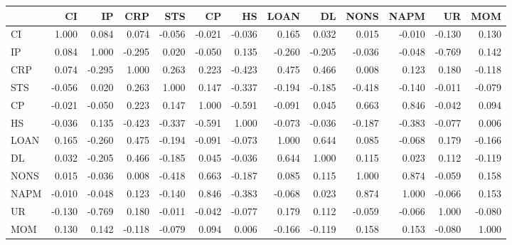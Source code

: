 \begin{tabular}{lrrrrrrrrrrrr}
\toprule
{} &     CI &     IP &    CRP &    STS &     CP &     HS &   LOAN &     DL &   NONS &   NAPM &     UR &    MOM \\
\midrule
CI   &  1.000 &  0.084 &  0.074 & -0.056 & -0.021 & -0.036 &  0.165 &  0.032 &  0.015 & -0.010 & -0.130 &  0.130 \\
IP   &  0.084 &  1.000 & -0.295 &  0.020 & -0.050 &  0.135 & -0.260 & -0.205 & -0.036 & -0.048 & -0.769 &  0.142 \\
CRP  &  0.074 & -0.295 &  1.000 &  0.263 &  0.223 & -0.423 &  0.475 &  0.466 &  0.008 &  0.123 &  0.180 & -0.118 \\
STS  & -0.056 &  0.020 &  0.263 &  1.000 &  0.147 & -0.337 & -0.194 & -0.185 & -0.418 & -0.140 & -0.011 & -0.079 \\
CP   & -0.021 & -0.050 &  0.223 &  0.147 &  1.000 & -0.591 & -0.091 &  0.045 &  0.663 &  0.846 & -0.042 &  0.094 \\
HS   & -0.036 &  0.135 & -0.423 & -0.337 & -0.591 &  1.000 & -0.073 & -0.036 & -0.187 & -0.383 & -0.077 &  0.006 \\
LOAN &  0.165 & -0.260 &  0.475 & -0.194 & -0.091 & -0.073 &  1.000 &  0.644 &  0.085 & -0.068 &  0.179 & -0.166 \\
DL   &  0.032 & -0.205 &  0.466 & -0.185 &  0.045 & -0.036 &  0.644 &  1.000 &  0.115 &  0.023 &  0.112 & -0.119 \\
NONS &  0.015 & -0.036 &  0.008 & -0.418 &  0.663 & -0.187 &  0.085 &  0.115 &  1.000 &  0.874 & -0.059 &  0.158 \\
NAPM & -0.010 & -0.048 &  0.123 & -0.140 &  0.846 & -0.383 & -0.068 &  0.023 &  0.874 &  1.000 & -0.066 &  0.153 \\
UR   & -0.130 & -0.769 &  0.180 & -0.011 & -0.042 & -0.077 &  0.179 &  0.112 & -0.059 & -0.066 &  1.000 & -0.080 \\
MOM  &  0.130 &  0.142 & -0.118 & -0.079 &  0.094 &  0.006 & -0.166 & -0.119 &  0.158 &  0.153 & -0.080 &  1.000 \\
\bottomrule
\end{tabular}
